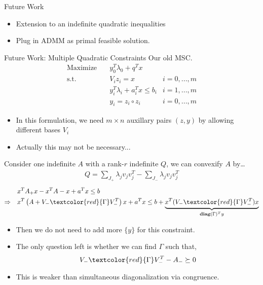 \documentclass[aspectratio=1610, 10pt]{beamer}
\newcommand{\diag}{\mathbf{diag}}
\newcommand{\red}[1]{\textcolor{red}{#1}}
\begin{document}
\begin{frame}[allowframebreaks]{Future Work}
  \begin{itemize}
    \item Extension to an indefinite quadratic inequalities
    \item Plug in ADMM as primal feasible solution.
  \end{itemize}
\end{frame}

\begin{frame}[allowframebreaks]{Future Work: Multiple Quadratic Constraints}
  Our old MSC.
  \begin{align}
    \nonumber \mathrm{Maximize}\quad & y_0 ^T\lambda_0 + q^Tx                         \\
    \mathrm{s.t.} \quad              & V_i z_i = x                        & i=0,...,m \\
                                     & y_i ^T\lambda_i  + a_i^Tx  \le b_i & i=1,...,m \\
    \label{quad}                     & y_i = z_i \circ z_i                & i=0,...,m
  \end{align}
  \begin{itemize}
    \item In this formulation, we need \(m \times n\) auxillary pairs \((z, y)\) by allowing different bases \(V_i\)
    \item Actually this may not be necessary...
  \end{itemize}

  \framebreak
  Consider one indefinite \(A\) with a rank-\(r\) indefinite \(Q\), we can convexify \(A\) by\dots
  \begin{align*}
    Q = \sum_{J_+} \lambda_j v_jv_j^T - \sum_{J_-} \lambda_j v_jv_j^T
  \end{align*}
  \begin{eqnarray}
    & x^TA_+ x - x^TA-x + a^Tx \le b \\
    \Rightarrow \quad & x^T\left(A + V_-\red{\Gamma}V^T_-\right )x +a^Tx \le b + \underbrace{x^T(V_-\red{\Gamma}V^T_-)x}_{\diag(\Gamma)^Ty}
  \end{eqnarray}
  \begin{itemize}
    \item Then we do not need to add more \(\{y\}\) for this constraint.
    \item The only question left is whether we can find \(\Gamma\) such that,
          \begin{equation}
            V_-\red{\Gamma}V^T_- - A_- \succeq 0
          \end{equation}
    \item This is weaker than simultaneous diagonalization via congruence.
  \end{itemize}
\end{frame}
\end{document}
